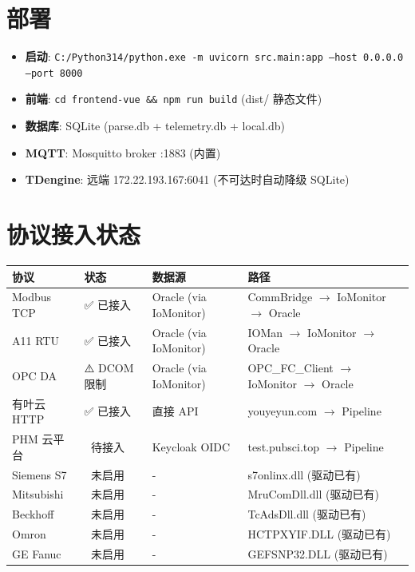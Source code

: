 \documentclass[12pt,a4paper]{ctexart}
\begin{document}
\section{部署}

\begin{itemize}[leftmargin=*]
  \item \textbf{启动}: \texttt{C:/Python314/python.exe -m uvicorn src.main:app --host 0.0.0.0 --port 8000}
  \item \textbf{前端}: \texttt{cd frontend-vue \&\& npm run build} (dist/ 静态文件)
  \item \textbf{数据库}: SQLite (parse.db + telemetry.db + local.db)
  \item \textbf{MQTT}: Mosquitto broker :1883 (内置)
  \item \textbf{TDengine}: 远端 172.22.193.167:6041 (不可达时自动降级 SQLite)
\end{itemize}

\section{协议接入状态}

\begin{longtable}{p{3cm}p{2.5cm}p{4cm}p{3.5cm}}
\toprule
\textbf{协议} & \textbf{状态} & \textbf{数据源} & \textbf{路径} \\
\midrule
Modbus TCP & ✅ 已接入 & Oracle (via IoMonitor) & CommBridge $\rightarrow$ IoMonitor $\rightarrow$ Oracle \\
A11 RTU & ✅ 已接入 & Oracle (via IoMonitor) & IOMan $\rightarrow$ IoMonitor $\rightarrow$ Oracle \\
OPC DA & ⚠️ DCOM 限制 & Oracle (via IoMonitor) & OPC\_FC\_Client $\rightarrow$ IoMonitor $\rightarrow$ Oracle \\
有叶云 HTTP & ✅ 已接入 & 直接 API & youyeyun.com $\rightarrow$ Pipeline \\
PHM 云平台 & 🔲 待接入 & Keycloak OIDC & test.pubsci.top $\rightarrow$ Pipeline \\
Siemens S7 & 🔲 未启用 & - & s7onlinx.dll (驱动已有) \\
Mitsubishi & 🔲 未启用 & - & MruComDll.dll (驱动已有) \\
Beckhoff & 🔲 未启用 & - & TcAdsDll.dll (驱动已有) \\
Omron & 🔲 未启用 & - & HCTPXYIF.DLL (驱动已有) \\
GE Fanuc & 🔲 未启用 & - & GEFSNP32.DLL (驱动已有) \\
\bottomrule
\end{longtable}
\end{document}
